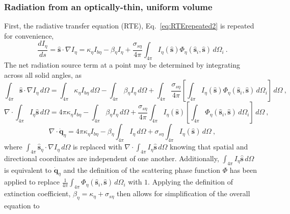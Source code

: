 \subsubsection{Radiation from an optically-thin, uniform volume}
First, the radiative transfer equation (RTE), Eq.~\ref{eq:RTErepeated2} is repeated for convenience,
\begin{equation}
    \frac{dI_\eta{}}{ds} = \hat{\textbf{s}} \cdot \nabla{I_\eta{}} = \kappa{}_\eta{}I_{b\eta{}}-\beta{}_{\eta{}}I_\eta{}+\frac{\sigma{}_{s\eta{}}}{4\pi}\int_{4\pi{}}{I_\eta{}(\hat{\textbf{s}})\Phi_\eta{}(\hat{\textbf{s}}_i,\hat{\textbf{s}})}\,d\Omega{}_i \ .
    \label{eq:RTErepeated2}
\end{equation}
The net radiation source term at a point may be determined by integrating across all solid angles, as
\begin{equation}
    \int_{4\pi}\hat{\textbf{s}} \cdot \nabla{I_\eta{}}\,d\Omega = \int_{4\pi} { \kappa{}_\eta{}I_{b\eta{}} }\,d\Omega-\int_{4\pi}\beta{}_{\eta{}}I_\eta{}\,d\Omega+\int_{4\pi}\frac{\sigma{}_{s\eta{}}}{4\pi}\left[\int_{4\pi{}}{I_\eta{}(\hat{\textbf{s}})\Phi_\eta{}(\hat{\textbf{s}}_i,\hat{\textbf{s}})}\,d\Omega{}_i\right]\,d\Omega \ ,
\end{equation}
\begin{equation}
    \nabla \cdot \int_{4\pi}I_\eta{}\hat{\textbf{s}}\,d\Omega = 4\pi\kappa{}_\eta{}I_{b\eta{}}-\int_{4\pi}\beta{}_{\eta{}}I_\eta{}\,d\Omega+\frac{\sigma{}_{s\eta{}}}{4\pi}\int_{4\pi}I_\eta{}(\hat{\textbf{s}})\left[\int_{4\pi{}}{\Phi_\eta{}(\hat{\textbf{s}}_i,\hat{\textbf{s}})}\,d\Omega{}_i\right]\,d\Omega \ ,
\end{equation}
\begin{equation}
    \nabla \cdot \dot{\textbf{q}}_\eta{} = 4\pi\kappa{}_\eta{}I_{b\eta{}}-\beta{}_{\eta{}}\int_{4\pi}I_\eta{}\,d\Omega+\sigma{}_{s\eta{}}\int_{4\pi}I_\eta{}(\hat{\textbf{s}})\,d\Omega \ ,
\end{equation}
where $\int_{4\pi}\hat{\textbf{s}}_\eta{} \cdot \nabla{I_\eta{}}\,d\Omega$ is replaced with $\nabla \cdot \int_{4\pi}I_\eta{}\hat{\textbf{s}}\,d\Omega$ knowing that spatial and directional coordinates are independent of one another.
Additionally, $\int_{4\pi}I_\eta{}\hat{\textbf{s}}\,d\Omega$ is equivalent to $\dot{\textbf{q}}_\eta{}$ and the definition of the scattering phase function $\Phi$ has been applied to replace $\frac{1}{4\pi}\int_{4\pi{}}{\Phi_\eta{}(\hat{\textbf{s}}_i,\hat{\textbf{s}})}\,d\Omega{}_i$ with $1$.
Applying the definition of extinction coefficient, $\beta_\eta=\kappa_\eta+\sigma_{s\eta}$ then allows for simplification of the overall equation to
